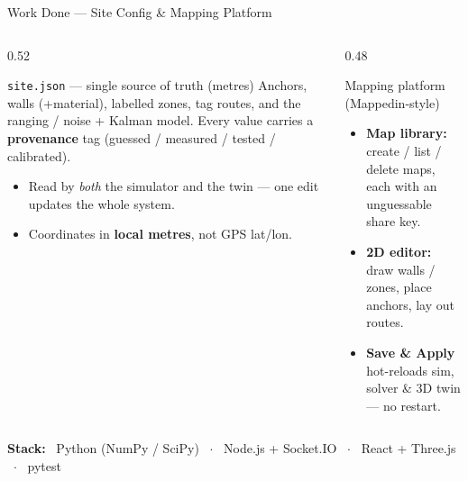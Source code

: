 \documentclass[aspectratio=169,10pt]{beamer}
\begin{document}
\begin{frame}{Work Done --- Site Config \& Mapping Platform}
  \begin{columns}[T]
    \begin{column}{0.52\textwidth}
      \begin{block}{\texttt{site.json} --- single source of truth (metres)}
        \footnotesize Anchors, walls (+material), labelled zones, tag routes, and the
        ranging / noise + Kalman model. Every value carries a \textbf{provenance} tag
        (guessed / measured / tested / calibrated).
      \end{block}
      \begin{itemize}\small
        \item Read by \emph{both} the simulator and the twin --- one edit updates the whole system.
        \item Coordinates in \textbf{local metres}, not GPS lat/lon.
      \end{itemize}
    \end{column}
    \begin{column}{0.48\textwidth}
      \begin{block}{Mapping platform (Mappedin-style)}
        \footnotesize
        \begin{itemize}\small
          \item \textbf{Map library:} create / list / delete maps, each with an unguessable share key.
          \item \textbf{2D editor:} draw walls / zones, place anchors, lay out routes.
          \item \textbf{Save \& Apply} hot-reloads sim, solver \& 3D twin --- no restart.
        \end{itemize}
      \end{block}
    \end{column}
  \end{columns}
  \vspace{2pt}
  \begin{center}\footnotesize
  \textbf{Stack:}~ Python (NumPy / SciPy) ~$\cdot$~ Node.js + Socket.IO ~$\cdot$~ React + Three.js ~$\cdot$~ pytest
  \end{center}
\end{frame}
\end{document}
